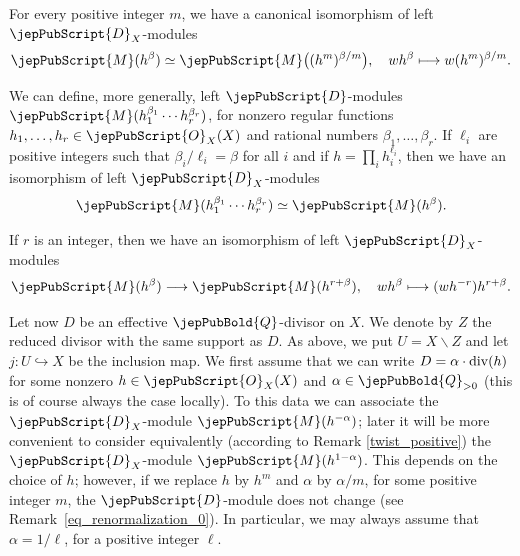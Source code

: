 \begin{remark}\label{eq_renormalization_0}
For every positive integer $m$, we have a canonical isomorphism of  left $\jepPubScript{D}_X$-modules
$$\jepPubScript{M}(h^{\beta})\simeq\jepPubScript{M}\big((h^m)^{\beta /m}\big),\,\,\,\,\,\,wh^{\beta}\longmapsto w(h^m)^{\beta/m}.$$
\end{remark}


\begin{remark}\label{twist_individual}
We can define, more generally, left $\jepPubScript{D}$-modules $\jepPubScript{M}(h_1^{\beta_1}\cdots h_r^{\beta_r})$, for 
nonzero regular functions $h_1,\ldots,h_r\in\jepPubScript{O}_X(X)$ and rational numbers $\beta_1,\ldots,\beta_r$. 
If $\ell_i$ are positive integers such that
$\beta_i/\ell_i=\beta$ for all $i$ and if $h=\prod_ih_i^{\ell_i}$, then we have an isomorphism of left $\jepPubScript{D}_X$-modules
$$\jepPubScript{M}(h_1^{\beta_1}\cdots h_r^{\beta_r})\simeq \jepPubScript{M}(h^{\beta}).$$
\end{remark}

\begin{remark}\label{twist_positive}
If $r$ is an integer, then we have an isomorphism of left $\jepPubScript{D}_X$-modules
$$\jepPubScript{M}(h^{\beta})\longrightarrow \jepPubScript{M}(h^{r + \beta}), \,\,\,\,\,\,wh^{\beta}\longmapsto (wh^{-r}) h^{r+\beta}.$$
\end{remark}

\medskip

Let now $D$ be an effective $\jepPubBold{Q}$-divisor on $X$. We denote by $Z$ the reduced divisor with the same support as $D$. 
As above, we put $U=X\smallsetminus Z$ and let $j\colon U\hookrightarrow X$ be the inclusion map. 
We first assume that we can write $D=\alpha\cdot {\rm div}(h)$ for some nonzero $h\in\jepPubScript{O}_X(X)$ and $\alpha\in\jepPubBold{Q}_{>0}$ (this is of course 
always the case locally). To this data we can associate the $\jepPubScript{D}_X$-module $\jepPubScript{M}(h^{-\alpha})$; later it will be more convenient to 
consider equivalently (according to Remark \ref{twist_positive}) the $\jepPubScript{D}_X$-module $\jepPubScript{M}(h^{1-\alpha})$. 
This depends on the choice of $h$; however, if we replace $h$ by $h^m$ and $\alpha$ by $\alpha/m$, for some positive integer $m$,
the $\jepPubScript{D}$-module does not change (see Remark~\ref{eq_renormalization_0}). In particular, we may always assume that $\alpha=1/\ell$,
for a positive integer $\ell$.




